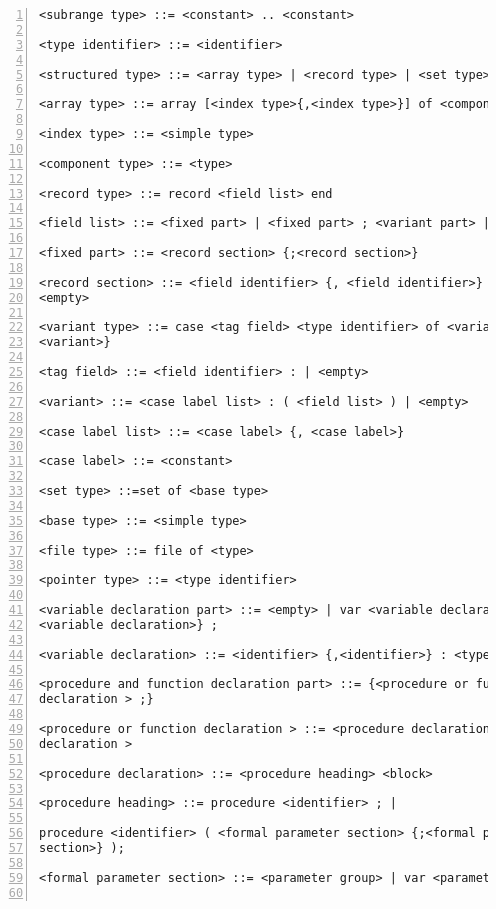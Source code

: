 \begin{Verbatim}[numbers=left]
<subrange type> ::= <constant> .. <constant>

<type identifier> ::= <identifier>

<structured type> ::= <array type> | <record type> | <set type> | <file type>

<array type> ::= array [<index type>{,<index type>}] of <component type>

<index type> ::= <simple type>

<component type> ::= <type>

<record type> ::= record <field list> end

<field list> ::= <fixed part> | <fixed part> ; <variant part> | <variant part>

<fixed part> ::= <record section> {;<record section>}

<record section> ::= <field identifier> {, <field identifier>} : <type> |
<empty>

<variant type> ::= case <tag field> <type identifier> of <variant> { ;
<variant>}

<tag field> ::= <field identifier> : | <empty>

<variant> ::= <case label list> : ( <field list> ) | <empty>

<case label list> ::= <case label> {, <case label>}

<case label> ::= <constant>

<set type> ::=set of <base type>

<base type> ::= <simple type>

<file type> ::= file of <type>

<pointer type> ::= <type identifier>

<variable declaration part> ::= <empty> | var <variable declaration> {;
<variable declaration>} ;

<variable declaration> ::= <identifier> {,<identifier>} : <type>

<procedure and function declaration part> ::= {<procedure or function
declaration > ;}

<procedure or function declaration > ::= <procedure declaration > | <function
declaration >

<procedure declaration> ::= <procedure heading> <block>

<procedure heading> ::= procedure <identifier> ; |

procedure <identifier> ( <formal parameter section> {;<formal parameter
section>} );

<formal parameter section> ::= <parameter group> | var <parameter group> |


\end{Verbatim}
